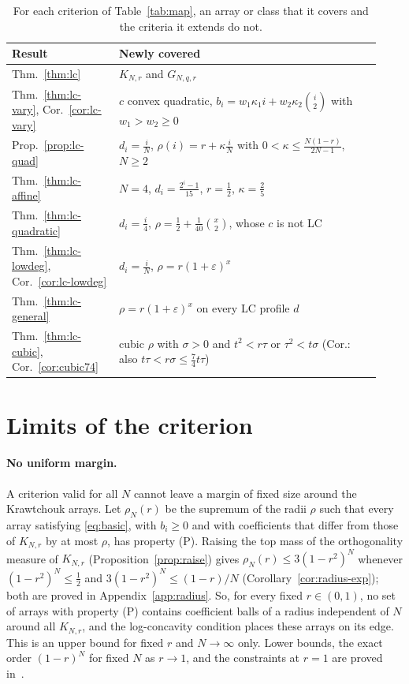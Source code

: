 \begin{table}[!ht]
\centering
\caption{For each criterion of Table~\ref{tab:map}, an array or class that it covers and the criteria it extends do not.}\label{tab:examples}
\renewcommand{\arraystretch}{1.15}
\begin{tabular}{@{}>{\raggedright\arraybackslash}p{0.27\linewidth}>{\raggedright\arraybackslash}p{0.66\linewidth}@{}}
Result & Newly covered\\\hline
Thm.~\ref{thm:lc} & $K_{N,r}$ and $G_{N,q,r}$\\
Thm.~\ref{thm:lc-vary}, Cor.~\ref{cor:lc-vary} & $c$ convex quadratic, $b_i=w_1\kappa_1i+w_2\kappa_2\binom i2$ with $w_1>w_2\geq0$\\
Prop.~\ref{prop:lc-quad} & $d_i=\frac iN$, $\rho(i)=r+\kappa\frac iN$ with $0<\kappa\leq\frac{N(1-r)}{2N-1}$, $N\geq2$\\
Thm.~\ref{thm:lc-affine} & $N=4$, $d_i=\frac{2^i-1}{15}$, $r=\frac12$, $\kappa=\frac25$\\
Thm.~\ref{thm:lc-quadratic} & $d_i=\frac i4$, $\rho=\frac12+\frac1{40}\binom x2$, whose $c$ is not LC\\
Thm.~\ref{thm:lc-lowdeg}, Cor.~\ref{cor:lc-lowdeg} & $d_i=\frac iN$, $\rho=r(1+\varepsilon)^x$\\
Thm.~\ref{thm:lc-general} & $\rho=r(1+\varepsilon)^x$ on every LC profile $d$\\
Thm.~\ref{thm:lc-cubic}, Cor.~\ref{cor:cubic74} & cubic $\rho$ with $\sigma>0$ and $t^2<r\tau$ or $\tau^2<t\sigma$ (Cor.: also $t\tau<r\sigma\leq\frac74t\tau$)
\end{tabular}
\end{table}

\section{Limits of the criterion}\label{sec:limits}

\paragraph{No uniform margin.} A criterion valid for all $N$ cannot leave a margin of fixed size around the Krawtchouk arrays. Let $\rho_N(r)$ be the supremum of the radii $\rho$ such that every array satisfying \eqref{eq:basic}, with $b_i\geq0$ and with coefficients that differ from those of $K_{N,r}$ by at most $\rho$, has property (P). Raising the top mass of the orthogonality measure of $K_{N,r}$ (Proposition~\ref{prop:raise}) gives $\rho_N(r)\leq3(1-r^2)^N$ whenever $(1-r^2)^N\leq\frac12$ and $3(1-r^2)^N\leq(1-r)/N$ (Corollary~\ref{cor:radius-exp}); both are proved in Appendix~\ref{app:radius}. So, for every fixed $r\in(0,1)$, no set of arrays with property (P) contains coefficient balls of a radius independent of $N$ around all $K_{N,r}$, and the log-concavity condition places these arrays on its edge. This is an upper bound for fixed $r$ and $N\to\infty$ only. Lower bounds, the exact order $(1-r)^N$ for fixed $N$ as $r\to1$, and the constraints at $r=1$ are proved in~\cite{P3}.

